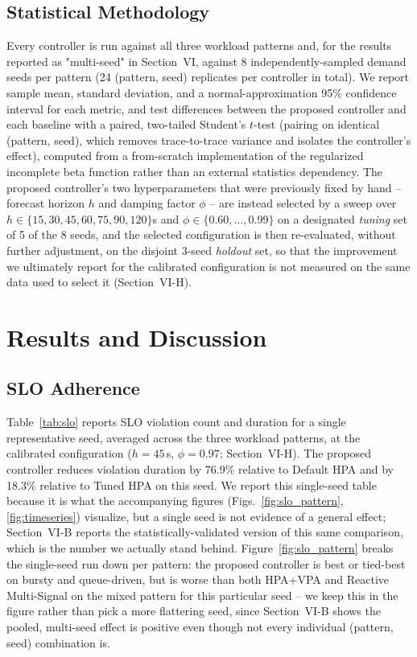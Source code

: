 \documentclass[conference]{IEEEtran}
\begin{document}
\subsection{Statistical Methodology}
Every controller is run against all three workload patterns and, for the results reported as
"multi-seed" in Section~VI, against 8 independently-sampled demand seeds per pattern (24
(pattern, seed) replicates per controller in total). We report sample mean, standard deviation, and a
normal-approximation 95\% confidence interval for each metric, and test differences between the
proposed controller and each baseline with a paired, two-tailed Student's $t$-test (pairing on
identical (pattern, seed), which removes trace-to-trace variance and isolates the controller's effect),
computed from a from-scratch implementation of the regularized incomplete beta function rather than an
external statistics dependency. The proposed controller's two hyperparameters that were previously
fixed by hand -- forecast horizon $h$ and damping factor $\phi$ -- are instead selected by a sweep over
$h \in \{15,30,45,60,75,90,120\}$s and $\phi \in \{0.60,\ldots,0.99\}$ on a designated \emph{tuning} set
of 5 of the 8 seeds, and the selected configuration is then re-evaluated, without further adjustment, on
the disjoint 3-seed \emph{holdout} set, so that the improvement we ultimately report for the calibrated
configuration is not measured on the same data used to select it (Section~VI-H).

\section{Results and Discussion}

\subsection{SLO Adherence}
Table~\ref{tab:slo} reports SLO violation count and duration for a single representative seed,
averaged across the three workload patterns, at the calibrated configuration ($h=45$\,s, $\phi=0.97$;
Section~VI-H). The proposed controller reduces violation duration by 76.9\% relative to Default HPA
and by 18.3\% relative to Tuned HPA on this seed. We report this single-seed table because it is what
the accompanying figures (Figs.~\ref{fig:slo_pattern}, \ref{fig:timeseries}) visualize, but a single
seed is not evidence of a general effect; Section~VI-B reports the statistically-validated version of
this same comparison, which is the number we actually stand behind. Figure~\ref{fig:slo_pattern} breaks
the single-seed run down per pattern: the proposed controller is best or tied-best on bursty and
queue-driven, but is worse than both HPA+VPA and Reactive Multi-Signal on the mixed pattern for this
particular seed -- we keep this in the figure rather than pick a more flattering seed, since
Section~VI-B shows the pooled, multi-seed effect is positive even though not every individual
(pattern, seed) combination is.
\end{document}
